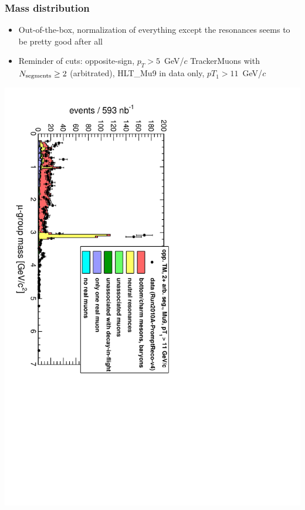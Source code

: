 \documentclass[compress]{beamer}
\newcommand{\s}[1]{{\mbox{\scriptsize #1}}}
\begin{document}
\begin{frame}
\frametitle{Mass distribution}
\begin{itemize}
\item Out-of-the-box, normalization of everything except the
resonances seems to be pretty good after all
\item Reminder of cuts: opposite-sign, $p_T > 5$~GeV/$c$ TrackerMuons with $N_\s{segments} \ge 2$ (arbitrated), HLT\_Mu9 in data only, $pT_1 > 11$~GeV/$c$
\end{itemize}

\vfill
\includegraphics[height=\linewidth, angle=90]{Mu9_mass_general.pdf}
\end{frame}
\end{document}
